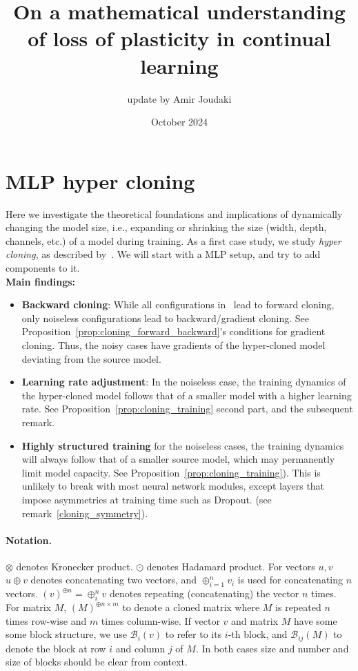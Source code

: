 \documentclass{article}
\title{On a mathematical understanding of loss of plasticity in continual learning}
\author{update by Amir Joudaki}
\date{October 2024}
\newcommand{\1}{\mathbf{1}}
\newcommand{\R}[2]{\mathcal{R}_{#2}(#1)}
\renewcommand{\R}[2]{({#1})^{\oplus #2}}
\newcommand{\bl}[2]{\mathcal{B}_{#2}({#1})}
\begin{document}
\maketitle


\section{MLP hyper cloning}
Here we investigate the theoretical
foundations and implications of dynamically changing the model size, i.e., expanding or shrinking the size (width, depth, channels, etc.) of a model during training. As a first case study, we study \textit{hyper cloning}, as described by~\citet{samragh2024scaling}. We will start with a MLP setup, and try to add components to it.
\\

\textbf{Main findings:}
\begin{itemize}
    \item \textbf{Backward cloning}: While all configurations in~\citet{samragh2024scaling} lead to forward cloning, only noiseless configurations lead to backward/gradient cloning. See Proposition~\ref{prop:cloning_forward_backward}'s conditions for gradient cloning. Thus, the noisy cases have gradients of the hyper-cloned model deviating from the source model. 
    \item \textbf{Learning rate adjustment}: In the noiseless case, the training dynamics of the hyper-cloned model follows that of a smaller model with a higher learning rate. See Proposition~\ref{prop:cloning_training} second part, and the subsequent remark. 
    \item \textbf{Highly structured training} for the noiseless cases, the training dynamics will always follow that of a smaller source model, which may permanently limit model capacity. See Proposition~\ref{prop:cloning_training}). This is unlikely to break with most neural network modules, except layers that impose asymmetries at training time such as Dropout. (see remark~\ref{cloning_symmetry}). 
\end{itemize}


\paragraph{Notation.} 
$\otimes $ denotes Kronecker product. $\odot$ denotes Hadamard product.
For vectors $u,v$ $u\oplus v $ denotes concatenating two vectors, and $\oplus_{i=1}^n v_i$ is used for concatenating $n$ vectors.
$\R{v}{n}=\oplus_i^n v$ denotes repeating (concatenating) the vector $n$ times. For matrix $M$, $\R{M}{n\times m}$ to denote a cloned matrix where $M$ is repeated $n$ times row-wise and $m$ times column-wise. If vector $v$ and matrix $M$ have some some block structure, we use $\bl{v}{i}$ to refer to its $i$-th block, and $\bl{M}{ij}$ to denote the block at row $i$ and column $j$ of $M.$ In both cases size and number and size of blocks should be clear from context. 
\newpage 
\end{document}
